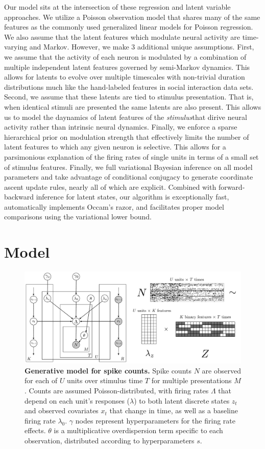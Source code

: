 \documentclass{article} %
\begin{document}
Our model sits at the intersection of these regression and latent variable approaches. We utilize a Poisson observation model that shares many of the same features as the commonly used generalized linear models for Poisson regression. We also assume that the latent features which modulate neural activity are time-varying and Markov. However, we make 3 additional unique assumptions. First, we assume that the activity of each neuron is modulated by a combination of multiple independent latent features governed by semi-Markov dynamics.  This allows for latents to evolve over multiple timescales with non-trivial duration distributions much like the hand-labeled features in social interaction data sets. Second, we assume that these latents are tied to stimulus presentation.  That is, when identical stimuli are presented the same latents are also present.  This allows us to model the daynamics of latent features of the \emph{stimulus}that dirive neural activity rather than intrinsic neural dynamics. Finally, we enforce a sparse hierarchical prior on modulation strength that effectively limits the number of latent features to which any given neuron is selective. This allows for a parsimonious explanation of the firing rates of single units in terms of a small set of stimulus features. Finally, we full variational Bayesian inference on all model parameters and take advantage of conditional conjugacy to generate coordinate ascent update rules, nearly all of which are explicit. Combined with forward-backward inference for latent states, our algorithm is exceptionally fast, automatically implements Occam's razor, and facilitates proper model comparisons using the variational lower bound.

\section{Model}
\label{model_sec}
\begin{figure}[ht]
    \includegraphics[width=1\linewidth]{figures/model}
    \caption{\textbf{Generative model for spike counts.} Spike counts $N$ are observed for each of $U$ units over stimulus time $T$ for multiple presentations $M$. Counts are assumed Poisson-distributed, with firing rates $\Lambda$ that depend on each unit's responses ($\lambda$) to both latent discrete states $z_t$ and observed covariates $x_t$ that change in time, as well as a baseline firing rate $\lambda_0$. $\gamma$ nodes represent hyperparameters for the firing rate effects. $\theta$ is a multiplicative overdispersion term specific to each observation, distributed according to hyperparameters $s$.}
\end{figure}
\end{document}
